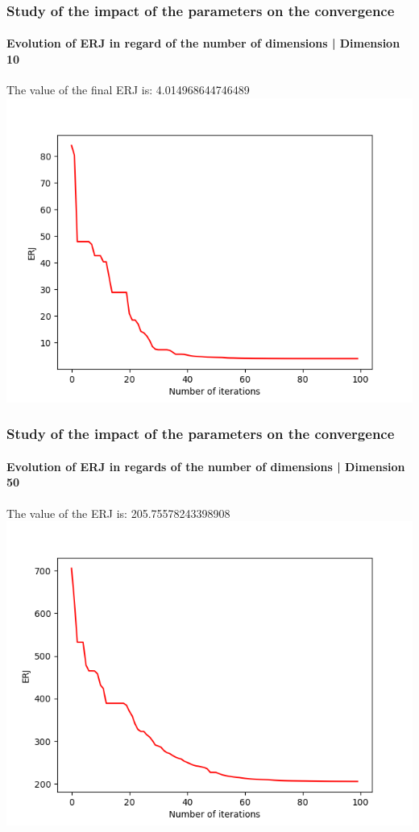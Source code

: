 \documentclass{beamer}
\begin{document}
	\begin{frame}
	\frametitle{\color{velvet} Study of the impact of the parameters on the convergence}
	\framesubtitle{Evolution of ERJ in regard of the number of dimensions | Dimension 10}
	The value of the final ERJ is: 4.014968644746489
	\includegraphics[scale=0.5]{Graphs/3.png}
	\end{frame}
	\begin{frame}
	\frametitle{\color{velvet} Study of the impact of the parameters on the convergence}
	\framesubtitle{Evolution of ERJ in regards of the number of dimensions | Dimension 50}
	The value of the ERJ is: 205.75578243398908
	\includegraphics[scale=0.5]{Graphs/4.png}
	\end{frame}
\end{document}
